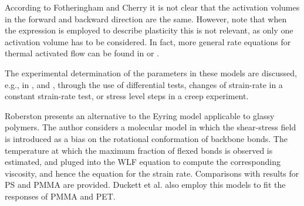 According to Fotheringham and Cherry \citep{fotheringhamRoleRecoveryForces1978} it is not clear that the activation volumes in the forward and backward direction are the same.
However, note that when the expression is employed to describe plasticity this is not relevant, as only one activation volume has to be considered.
In fact, more general rate equations for thermal activated flow can be found in \cite{brinkmanMechanicalThermodynamicalTheory1957} or \cite{kocks1975thermodynamics}.

The experimental determination of the parameters in these models are discussed, e.g., in \cite{evansThermallyActivatedDeformation1969}, \cite{conradAthermalComponentFlow1970} and \cite{kocks1975thermodynamics}, through the use of differential tests, changes of strain-rate in a constant strain-rate test, or stress level steps in a creep experiment.


Roberston \citep{robertsonTheoryPlasticityGlassy1966} presents an alternative to the Eyring model applicable to glassy polymers.
The author considers a molecular model in which the shear-stress field is introduced as a bias on the rotational conformation of backbone bonds.
The temperature at which the maximum fraction of flexed bonds is observed is estimated, and pluged into the WLF equation to compute the corresponding viscosity, and hence the equation for the strain rate.
Comparisons with results for PS and PMMA are provided.
Duckett et al. \citep{duckettStrainrateTemperaturePressure1970} also employ this models to fit the responses of PMMA and PET.

